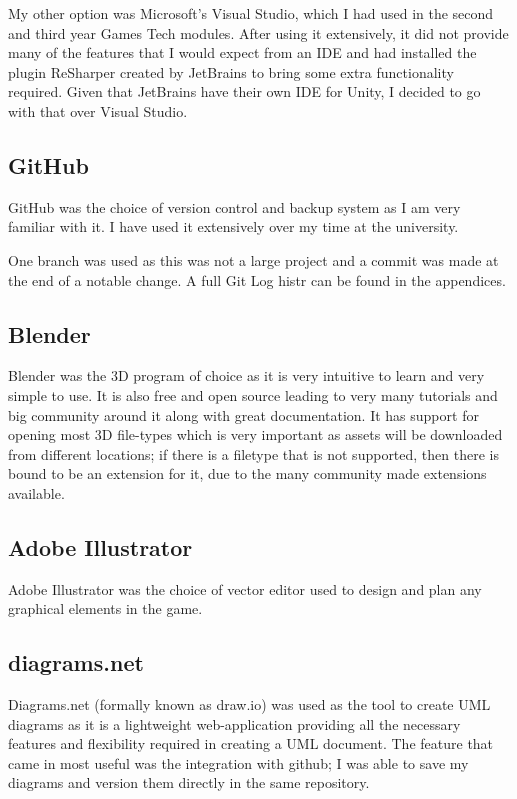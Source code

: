 \documentclass[11pt]{report}
\begin{document}
My other option was Microsoft's Visual Studio, which I had used in the second and third year Games Tech modules. After using it extensively, it did not provide many of the features that I would expect from an IDE and had installed the plugin ReSharper created by JetBrains to bring some extra functionality required. Given that JetBrains have their own IDE for Unity, I decided to go with that over Visual Studio.

\subsection{GitHub}
GitHub was the choice of version control and backup system as I am very familiar with it. I have used it extensively over my time at the university.

One branch was used as this was not a large project and a commit was made at the end of a notable change. A full Git Log histr can be found in the appendices.

\subsection{Blender}
Blender was the 3D program of choice as it is very intuitive to learn and very simple to use. It is also free and open source leading to very many tutorials and big community around it along with great documentation. It has support for opening most 3D file-types which is very important as assets will be downloaded from different locations; if there is a filetype that is not supported, then there is bound to be an extension for it, due to the many community made extensions available.

\subsection{Adobe Illustrator}
Adobe Illustrator was the choice of vector editor used to design and plan any graphical elements in the game. 

\subsection{diagrams.net}
Diagrams.net (formally known as draw.io) was used as the tool to create UML diagrams as it is a lightweight web-application providing all the necessary features and flexibility required in creating a UML document. The feature that came in most useful was the integration with github; I was able to save my diagrams and version them directly in the same repository.
\end{document}
